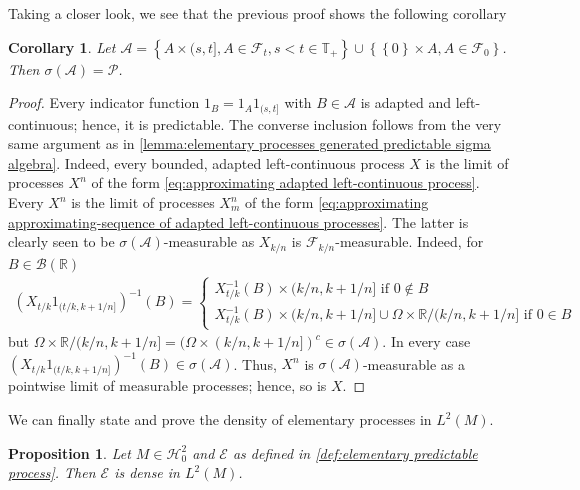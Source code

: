 \documentclass[11pt,a4paper,twoside,openany]{report}
\theoremstyle{plain} %
\newtheorem{proposition}[proposition]{Proposition}
\newtheorem{corollary}[corollary]{Corollary}
\theoremstyle{definition} %
\theoremstyle{remark} %
\begin{document}
Taking a closer look, we see that the previous proof shows the following corollary
\begin{corollary}
    Let \(\mathcal{A}=\left\{A\times(s,t], A\in\mathcal{F}_t, s<t\in\mathbb{T}_+\right\}\cup \left\{\left\{0\right\}\times A, A\in\mathcal{F}_0\right\}\). Then \(\sigma(\mathcal{A})=\mathcal{P}\).
\end{corollary}
\begin{proof}
    Every indicator function \(1_B=1_A1_{(s,t]}\) with \(B\in\mathcal{A}\) is adapted and left-continuous; hence, it is predictable. The converse inclusion follows from the very same argument as in \cref{lemma:elementary processes generated predictable sigma algebra}. Indeed, every bounded, adapted left-continuous process \(X\) is the limit of processes \(X^n\) of the form \cref{eq:approximating adapted left-continuous process}. Every \(X^n\) is the limit of processes \(X^n_m\) of the form \cref{eq:approximating approximating-sequence of adapted left-continuous processes}. The latter is clearly seen to be \(\sigma(\mathcal{A})\)-measurable as \(X_{k/n}\) is \(\mathcal{F}_{k/n}\)-measurable. Indeed, for \(B\in\mathcal{B}(\mathbb{R})\)
    \begin{align}
    (X_{t/k}1_{(t/k,k+1/n]})^{-1}(B)=
    \begin{cases}
        X_{t/k}^{-1}(B)\times (k/n,k+1/n] \text{ if }0\notin B\\
        X_{t/k}^{-1}(B)\times (k/n,k+1/n]\cup \Omega\times \mathbb{R}/(k/n,k+1/n]\text{ if }0\in B
    \end{cases}
    \end{align}
    but \( \Omega\times \mathbb{R}/(k/n,k+1/n]=(\Omega\times(k/n,k+1/n])^c\in\sigma(\mathcal{A})\). In every case \\
    \((X_{t/k}1_{(t/k,k+1/n]})^{-1}(B)\in\sigma(\mathcal{A})\).
 Thus, \(X^n\) is \(\sigma(\mathcal{A})\)-measurable as a pointwise limit of measurable processes; hence, so is \(X\).
\end{proof}
We can finally state and prove the density of elementary processes in \(L^2(M)\).
\begin{proposition}\label{prop:density of E in L2(M) via monotone class}
    Let \(M\in\mathcal{H}^2_0\) and \(\mathcal{E}\) as defined in \cref{def:elementary predictable process}. Then \(\mathcal{E}\) is dense in \(L^2(M)\).
\end{proposition}
\end{document}
